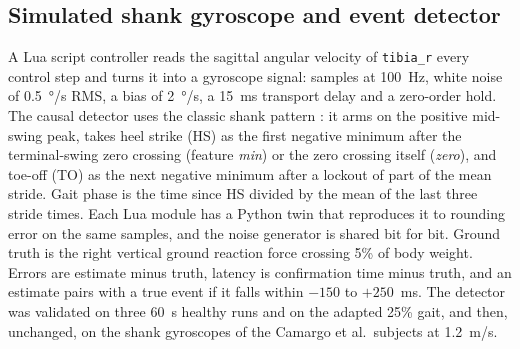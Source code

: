 \subsection{Simulated shank gyroscope and event detector}
A Lua script controller reads the sagittal angular velocity of \texttt{tibia\_r} every control step and turns it into a gyroscope signal: samples at \SI{100}{Hz}, white noise of \SI{0.5}{\degree/s} RMS, a bias of \SI{2}{\degree/s}, a \SI{15}{ms} transport delay and a zero-order hold. The causal detector uses the classic shank pattern \cite{aminian2002}: it arms on the positive mid-swing peak, takes heel strike (HS) as the first negative minimum after the terminal-swing zero crossing (feature \emph{min}) or the zero crossing itself (\emph{zero}), and toe-off (TO) as the next negative minimum after a lockout of part of the mean stride. Gait phase is the time since HS divided by the mean of the last three stride times. Each Lua module has a Python twin that reproduces it to rounding error on the same samples, and the noise generator is shared bit for bit. Ground truth is the right vertical ground reaction force crossing 5\% of body weight. Errors are estimate minus truth, latency is confirmation time minus truth, and an estimate pairs with a true event if it falls within $-150$ to $+250$~ms. The detector was validated on three 60~s healthy runs and on the adapted 25\% gait, and then, unchanged, on the shank gyroscopes of the Camargo et al.\ subjects at 1.2~m/s.

